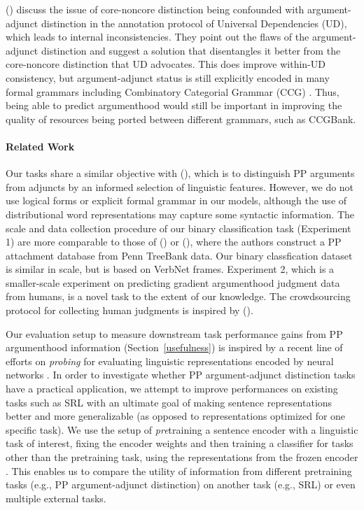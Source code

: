 \documentclass[letterpaper]{article} %
\begin{document}
\citeauthor{przepiorkowski2018arguments} (\citeyear{przepiorkowski2018arguments}) discuss the issue of core-noncore distinction being confounded with argument-adjunct distinction in the annotation protocol of Universal Dependencies (UD), which leads to internal inconsistencies. They point out the flaws of the argument-adjunct distinction and suggest a solution that disentangles it better from the core-noncore distinction that UD advocates. This does improve within-UD consistency, but argument-adjunct status is still explicitly encoded in many formal grammars including Combinatory Categorial Grammar (CCG) \cite{steedman2000syntactic}. Thus, being able to predict argumenthood would still be important in improving the quality of resources being ported between different grammars, such as CCGBank. 

\paragraph{Related Work}
Our tasks share a similar objective with \citeauthor{villavicencio2002learning} (\citeyear{villavicencio2002learning}), which is to distinguish PP arguments from adjuncts by an informed selection of linguistic features. However, we do not use logical forms or explicit formal grammar in our models, although the use of distributional word representations may capture some syntactic information. The scale and data collection procedure of our binary classification task (Experiment 1) are more comparable to those of \citeauthor{merlo2006notion} (\citeyear{merlo2006notion}) or \citeauthor{belinkov2014exploring} (\citeyear{belinkov2014exploring}), where the authors construct a PP attachment database from Penn TreeBank data. Our binary classfication dataset is similar in scale, but is based on VerbNet \cite{verbnet} frames. Experiment 2, which is a smaller-scale experiment on predicting gradient argumenthood judgment data from humans, is a novel task to the extent of our knowledge. The crowdsourcing protocol for collecting human judgments is inspired by \citeauthor{rissman2015using} (\citeyear{rissman2015using}).

Our evaluation setup to measure downstream task performance gains from PP argumenthood information (Section~\ref{usefulness}) is inspired by a recent line of efforts on \textit{probing} for evaluating linguistic representations encoded by neural networks \cite{gulordava2018colorless,ettinger2018assessing}. In order to investigate whether PP argument-adjunct distinction tasks have a practical application, we attempt to improve performances on existing tasks such as SRL with an ultimate goal of making sentence representations better and more generalizable (as opposed to representations optimized for one specific task). We use the setup of \textit{pre}training a sentence encoder with a linguistic task of interest, fixing the encoder weights and then training a classifier for tasks other than the pretraining task, using the representations from the frozen encoder \cite{bowman2018looking}. This enables us to compare the utility of information from different pretraining tasks (e.g., PP argument-adjunct distinction) on another task (e.g., SRL) or even multiple external tasks.
\end{document}
